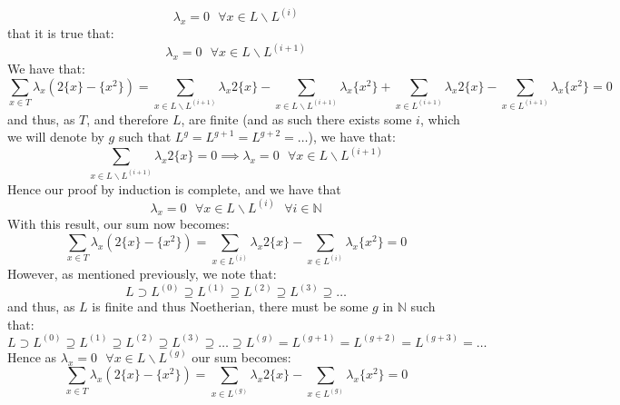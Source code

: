 \documentclass[11pt]{article}
\theoremstyle{plain}
\theoremstyle{definition}
\begin{document}
\begin{equation*}
\lambda_x = 0 \text{ }\forall x \in L\backslash L^{(i)} 
\end{equation*}
that it is true that:
\begin{equation*}
\lambda_x = 0 \text{ }\forall x \in L\backslash L^{(i+1)} 
\end{equation*}
We have that:
\begin{equation*}
\sum_{x \in T} \lambda_x (2\{x\} - \{x^2\}) = \sum_{x \in L\backslash L^{(i+1)}} \lambda_x 2\{x\} - \sum_{x \in L\backslash L^{(i+1)}} \lambda_x  \{x^2\} + \sum_{x \in L^{(i+1)}} \lambda_x 2\{x\} -  \sum_{x \in L^{(i+1)}} \lambda_x \{x^2\} = 0
\end{equation*}
and thus, as $T$, and therefore $L$, are finite (and as such there exists some $i$, which we will denote by $g$ such that $L^g = L^{g+1} = L^{g+2}=\ldots$), we have that:
\begin{equation*}
\sum_{x \in L\backslash L^{(i+1)}} \lambda_x 2\{x\} = 0 \implies \lambda_x = 0 \text{ } \forall x \in L\backslash L^{(i+1)}
\end{equation*}
Hence our proof by induction is complete, and we have that
\begin{equation*}
\lambda_x = 0 \text{ }  \forall x \in L\backslash L^{(i)} \text{ } \forall i \in \mathbb{N}
\end{equation*}
With this result, our sum now becomes:
\begin{equation*}
\sum_{x \in T} \lambda_x (2\{x\} - \{x^2\}) =  \sum_{x \in L^{(i)}} \lambda_x 2\{x\} -  \sum_{x \in L^{(i)}} \lambda_x \{x^2\} = 0
\end{equation*}
However, as mentioned previously, we note that:
\begin{equation*}
L \supset L^{(0)} \supseteq L^{(1)}  \supseteq L^{(2)}  \supseteq L^{(3)}  \supseteq \ldots
\end{equation*}
and thus, as $L$ is finite and thus Noetherian, there must be some $g$ in $\mathbb{N}$ such that:
\begin{equation*} 
L \supset L^{(0)} \supseteq L^{(1)}  \supseteq L^{(2)}  \supseteq L^{(3)}  \supseteq \ldots \supseteq L^{(g)} = L^{(g+1)} =L^{(g+2)} =L^{(g+3)}=\ldots 
\end{equation*}
Hence as $\lambda_x = 0 \text{ } \forall x\in L \backslash L^{(g)}$ our sum becomes:
\begin{equation*}
\sum_{x \in T} \lambda_x (2\{x\} - \{x^2\}) =  \sum_{x \in L^{(g)}} \lambda_x 2\{x\} -  \sum_{x \in L^{(g)}} \lambda_x \{x^2\} = 0
\end{equation*}
\end{document}

